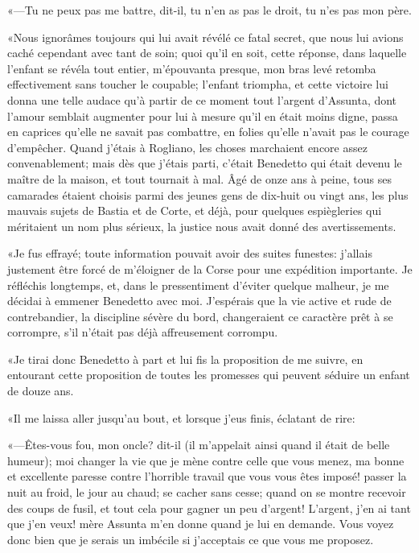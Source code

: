 «—Tu ne peux pas me battre, dit-il, tu n'en as pas le droit, tu n'es pas mon père. 

«Nous ignorâmes toujours qui lui avait révélé ce fatal secret, que nous lui avions caché cependant avec tant de soin; quoi qu'il en soit, cette réponse, dans laquelle l'enfant se révéla tout entier, m'épouvanta presque, mon bras levé retomba effectivement sans toucher le coupable; l'enfant triompha, et cette victoire lui donna une telle audace qu'à partir de ce moment tout l'argent d'Assunta, dont l'amour semblait augmenter pour lui à mesure qu'il en était moins digne, passa en caprices qu'elle ne savait pas combattre, en folies qu'elle n'avait pas le courage d'empêcher. Quand j'étais à Rogliano, les choses marchaient encore assez convenablement; mais dès que j'étais parti, c'était Benedetto qui était devenu le maître de la maison, et tout tournait à mal. Âgé de onze ans à peine, tous ses camarades étaient choisis parmi des jeunes gens de dix-huit ou vingt ans, les plus mauvais sujets de Bastia et de Corte, et déjà, pour quelques espiègleries qui méritaient un nom plus sérieux, la justice nous avait donné des avertissements. 

«Je fus effrayé; toute information pouvait avoir des suites funestes: j'allais justement être forcé de m'éloigner de la Corse pour une expédition importante. Je réfléchis longtemps, et, dans le pressentiment d'éviter quelque malheur, je me décidai à emmener Benedetto avec moi. J'espérais que la vie active et rude de contrebandier, la discipline sévère du bord, changeraient ce caractère prêt à se corrompre, s'il n'était pas déjà affreusement corrompu. 

«Je tirai donc Benedetto à part et lui fis la proposition de me suivre, en entourant cette proposition de toutes les promesses qui peuvent séduire un enfant de douze ans. 

«Il me laissa aller jusqu'au bout, et lorsque j'eus finis, éclatant de rire:  

«—Êtes-vous fou, mon oncle? dit-il (il m'appelait ainsi quand il était de belle humeur); moi changer la vie que je mène contre celle que vous menez, ma bonne et excellente paresse contre l'horrible travail que vous vous êtes imposé! passer la nuit au froid, le jour au chaud; se cacher sans cesse; quand on se montre recevoir des coups de fusil, et tout cela pour gagner un peu d'argent! L'argent, j'en ai tant que j'en veux! mère Assunta m'en donne quand je lui en demande. Vous voyez donc bien que je serais un imbécile si j'acceptais ce que vous me proposez. 

